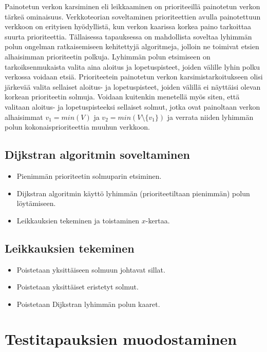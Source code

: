 Painotetun verkon karsiminen eli leikkaaminen on prioriteeillä painotetun verkon tärkeä ominaisuus.
Verkkoteorian soveltaminen prioriteettien avulla painotettuun verkkoon on erityisen hyödyllistä, kun verkon kaarissa korkea paino tarkoittaa suurta prioriteettia.
Tällaisessa tapauksessa on mahdollista soveltaa lyhimmän polun ongelman ratkaisemiseen kehitettyjä algoritmeja, jolloin ne toimivat etsien alhaisimman prioriteetin polkuja.
Lyhimmän polun etsimiseen on tarkoiksenmukaista valita aina aloitus ja lopetuspisteet, joiden välille lyhin polku verkossa voidaan etsiä.
Prioriteetein painotetun verkon karsimistarkoitukseen olisi järkevää valita sellaiset aloitus- ja lopetuspisteet, joiden välillä ei näyttäisi olevan korkean prioriteetin solmuja.
Voidaan kuitenkin menetellä myös siten, että valitaan aloitus- ja lopetuspisteeksi sellaiset solmut, jotka ovat painoltaan verkon alhaisimmat \(v_1 = min(V)\) ja \(v_2 = min(V \setminus \{v_1\})\) ja verrata niiden lyhimmän polun kokonaisprioriteettia muuhun verkkoon.

  \subsection{Dijkstran algoritmin soveltaminen}

  \begin{itemize}
    \item Pienimmän prioriteetin solmuparin etsiminen.
    \item Dijkstran algoritmin käyttö lyhimmän (prioriteetiltaan pienimmän) polun löytämiseen.
    \item Leikkauksien tekeminen ja toistaminen \(x\)-kertaa.
  \end{itemize}

  \subsection{Leikkauksien tekeminen}

  \begin{itemize}
    \item Poistetaan yksittäiseen solmuun johtavat sillat.
    \item Poistetaan yksittäiset eristetyt solmut.
    \item Poistetaan Dijkstran lyhimmän polun kaaret.
  \end{itemize}

\section{Testitapauksien muodostaminen}
